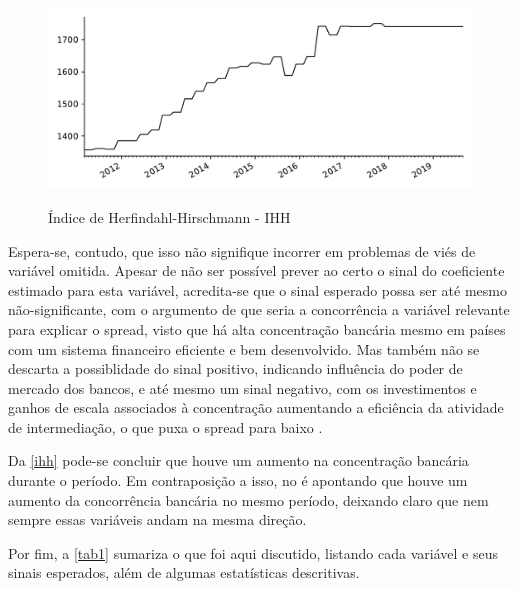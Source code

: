 \documentclass[a4paper,
               article,
               12pt,
               openany,
               oneside,
               english,
               brazil]{abntex2}
\numberwithin{equation}{section}
\begin{document}
    \begin{figure}[h]
        \centering
        \caption{Índice de Herfindahl-Hirschmann - IHH}
        \includegraphics[width = \textwidth, scale=0.75]{ihh.pdf}
        \label{ihh}
    \end{figure}

    Espera-se, contudo, que isso não signifique incorrer em problemas de viés de variável omitida. Apesar de não ser possível prever ao certo o sinal do coeficiente estimado para esta variável, acredita-se que o sinal esperado possa ser até mesmo não-significante, com o argumento de que seria a concorrência a variável relevante para explicar o spread, visto que há alta concentração bancária mesmo em países com um sistema financeiro eficiente e bem desenvolvido. Mas também não se descarta a possiblidade do sinal positivo, indicando influência do poder de mercado dos bancos, e até mesmo um sinal negativo, com os investimentos e ganhos de escala associados à concentração aumentando a eficiência da atividade de intermediação, o que puxa o spread para baixo \cite{reb2017}. 

    Da \autoref{ihh} pode-se concluir que houve um aumento na concentração bancária durante o período. Em contraposição a isso, no \textcite[11]{reb2017} é apontando que houve um aumento da concorrência bancária no mesmo período, deixando claro que nem sempre essas variáveis andam na mesma direção.

    Por fim, a \autoref{tab1} sumariza o que foi aqui discutido, listando cada variável e seus sinais esperados, além de algumas estatísticas descritivas.
\end{document}
